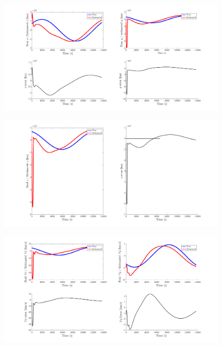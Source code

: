 \begin{figure}[H]
    \centering
    \includegraphics[width=\textwidth]{Figures/xy-error-1observers-250km.png}
    \caption{}
    \label{fig: xyerror-250-1}
\end{figure}
\begin{figure}[H]
    \centering
    \includegraphics[width=\textwidth]{Figures/z-error-1observers-250km.png}
    \caption{}
    \label{fig: zerror-250-1}
\end{figure}
\begin{figure}[H]
    \centering
    \includegraphics[width=\textwidth]{Figures/Vx-vy-error--250km-1obs.png}
    \caption{}
    \label{fig: vxyerror-250-1}
\end{figure}

